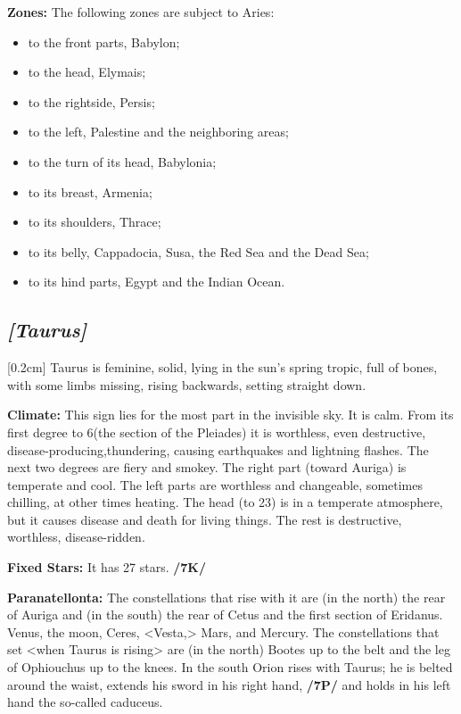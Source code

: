 \textbf{Zones:} The following zones are subject to Aries: 
\begin{itemize}
\item to the front parts, Babylon; 
\item to the head, Elymais; 
\item to the rightside, Persis; 
\item to the left, Palestine and the neighboring areas; 
\item to the turn of its head, Babylonia; 
\item to its breast, Armenia; 
\item to its shoulders, Thrace; 
\item to its belly, Cappadocia, Susa, the Red Sea and the Dead Sea; 
\item to its hind parts, Egypt and the Indian Ocean.
\end{itemize}

\secbr
\subsection{\textit{[Taurus]}}
[0.2cm]
Taurus is feminine, solid, lying in the sun’s spring tropic, full of bones, with some limbs missing, rising backwards, setting straight down. 

\textbf{Climate:} This sign lies for the most part in the invisible sky. It is calm. From its first degree to 6\deg (the section of the Pleiades) it is worthless, even destructive, disease-producing,thundering, causing earthquakes and lightning flashes. The next two degrees are fiery and smokey. The right part (toward Auriga) is temperate and cool. The left parts are worthless and changeable, sometimes chilling, at other times heating. The head (to 23\deg) is in a temperate atmosphere, but it causes disease and death for living things. The rest is destructive, worthless, disease-ridden.

\textbf{Fixed Stars:} It has 27 stars. \textbf{/7K/}

\textbf{Paranatellonta:} The constellations that rise with it are (in the north) the rear of Auriga and (in the south) the rear of Cetus and the first section of Eridanus. Venus, the moon, Ceres, <Vesta,> Mars, and Mercury. The constellations that set <when Taurus is rising> are (in the north) Bootes up to the belt and the leg of Ophiouchus up to the knees. In the south Orion rises with Taurus; he is belted around the waist,
extends his sword in his right hand, \textbf{/7P/} and holds in his left hand the so-called caduceus.

